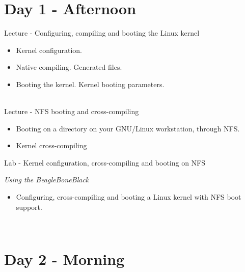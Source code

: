 \documentclass[a4paper,12pt,obeyspaces,spaces,hyphens]{article}
\begin{document}
\section{Day 1 - Afternoon}
\feagendaonecolumn
{Lecture - Configuring, compiling and booting the Linux kernel}
{
  \begin{itemize}
  \item Kernel configuration.
  \item Native compiling. Generated files.
  \item Booting the kernel. Kernel booting parameters.
  \end{itemize}
}
\\
\feagendatwocolumn
{Lecture - NFS booting and cross-compiling}
{
  \begin{itemize}
  \item Booting on a directory on your GNU/Linux workstation, through
    NFS.
  \item Kernel cross-compiling
  \end{itemize}
}
{Lab - Kernel configuration, cross-compiling and booting on NFS}
{
  {\em Using the BeagleBoneBlack}
  \begin{itemize}
  \item Configuring, cross-compiling and booting a Linux kernel with
    NFS boot support.
  \end{itemize}
}
\\
\section{Day 2 - Morning}
\end{document}
